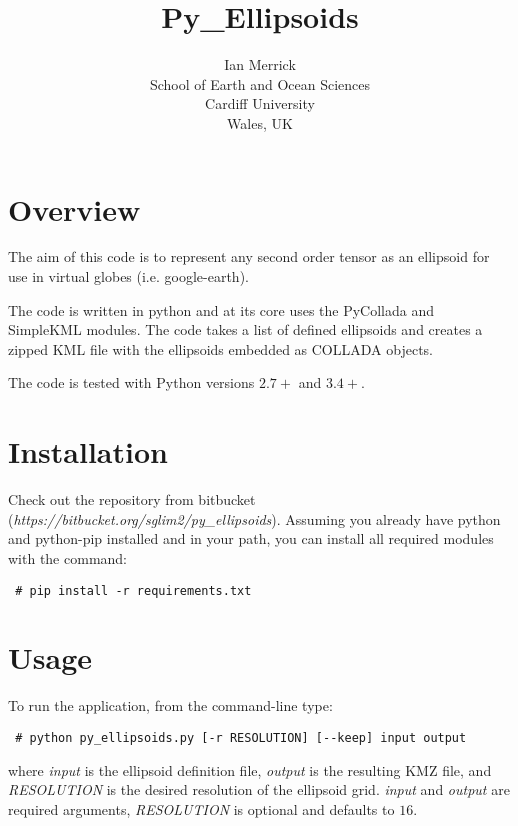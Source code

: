 \documentclass[11pt]{article}
\title{\textbf{Py\_Ellipsoids}}
\author{Ian Merrick\\
		School of Earth and Ocean Sciences\\
		Cardiff University\\
		Wales, UK}
\date{}
\begin{document}
\maketitle

\section{Overview}
The aim of this code is to represent any second order tensor as an ellipsoid for use in virtual globes (i.e. google-earth).

The code is written in python and at its core uses the PyCollada\cite{pycollada} and SimpleKML\cite{simplekml} modules. The code takes a list of defined ellipsoids and creates a zipped KML\cite{kml} file with the ellipsoids embedded as COLLADA\cite{collada} objects.

The code is tested with Python versions $2.7+$ and $3.4+$.

\section{Installation}
Check out the repository from bitbucket ({\em https://bitbucket.org/sglim2/py\_ellipsoids}). Assuming you already have python and python-pip installed and in your path, you can install all required modules with the command:
\begin{verbatim}
 # pip install -r requirements.txt
\end{verbatim}

\section{Usage}
To run the application, from the command-line type:
\begin{verbatim}
 # python py_ellipsoids.py [-r RESOLUTION] [--keep] input output
\end{verbatim}
where {\em input} is the ellipsoid definition file, {\em output} is the resulting KMZ file, and {\em RESOLUTION} is the desired resolution of the ellipsoid grid. {\em input} and {\em output} are required arguments, {\em RESOLUTION} is optional and defaults to $16$.
\end{document}
